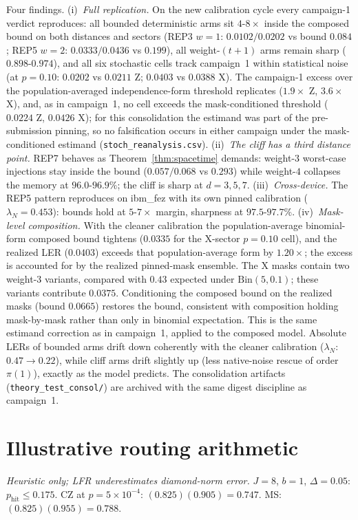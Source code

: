 \documentclass[pdflatex,sn-mathphys-num]{sn-jnl}
\theoremstyle{thmstyleone}
\theoremstyle{thmstyletwo}
\theoremstyle{thmstylethree}
\begin{document}
Four findings. (i)~\emph{Full replication.} On the new calibration cycle every campaign-1 verdict reproduces: all bounded deterministic arms sit $4$-$8\times$ inside the composed bound on both distances and sectors (REP3 $w{=}1$: $0.0102/0.0202$ vs bound $0.084$; REP5 $w{=}2$: $0.0333/0.0436$ vs $0.199$), all weight-$(t{+}1)$ arms remain sharp ($0.898$-$0.974$), and all six stochastic cells track campaign~1 within statistical noise (at $p{=}0.10$: $0.0202$ vs $0.0211$ Z; $0.0403$ vs $0.0388$ X). The campaign-1 excess over the population-averaged independence-form threshold replicates ($1.9\times$ Z, $3.6\times$ X), and, as in campaign~1, no cell exceeds the mask-conditioned threshold ($0.0224$ Z, $0.0426$ X); for this consolidation the estimand was part of the pre-submission pinning, so no falsification occurs in either campaign under the mask-conditioned estimand (\texttt{stoch\_reanalysis.csv}). (ii)~\emph{The cliff has a third distance point.} REP7 behaves as Theorem~\ref{thm:spacetime} demands: weight-$3$ worst-case injections stay inside the bound ($0.057/0.068$ vs $0.293$) while weight-$4$ collapses the memory at $96.0$-$96.9\%$; the cliff is sharp at $d{=}3,5,7$. (iii)~\emph{Cross-device.} The REP5 pattern reproduces on ibm\_fez with its own pinned calibration ($\lambda_N{=}0.453$): bounds hold at $5$-$7\times$ margin, sharpness at $97.5$-$97.7\%$. (iv)~\emph{Mask-level composition.} With the cleaner calibration the population-average binomial-form composed bound tightens ($0.0335$ for the X-sector $p{=}0.10$ cell), and the realized LER ($0.0403$) exceeds that population-average form by $1.20\times$; the excess is accounted for by the realized pinned-mask ensemble. The X masks contain two weight-3 variants, compared with $0.43$ expected under $\mathrm{Bin}(5,0.1)$; these variants contribute $0.0375$. Conditioning the composed bound on the realized masks (bound $0.0665$) restores the bound, consistent with composition holding mask-by-mask rather than only in binomial expectation. This is the same estimand correction as in campaign~1, applied to the composed model. Absolute LERs of bounded arms drift down coherently with the cleaner calibration ($\lambda_N$: $0.47{\to}0.22$), while cliff arms drift slightly up (less native-noise rescue of order $\pi(1)$), exactly as the model predicts. The consolidation artifacts (\texttt{theory\_test\_consol/}) are archived with the same digest discipline as campaign~1.

\section{Illustrative routing arithmetic}\label{app:routing}
\emph{Heuristic only; LFR underestimates diamond-norm error.} $J=8$, $b=1$, $\Delta=0.05$: $p_\mathrm{hit}\le0.175$. CZ at $p=5\times10^{-4}$: $(0.825)(0.905)=0.747$. MS: $(0.825)(0.955)=0.788$.



\end{document}
